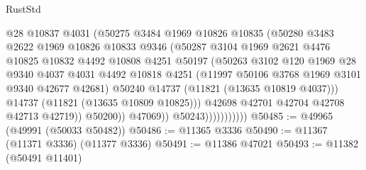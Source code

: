 \begin{lexlean}{RustStd}
\begin{coremodule}
                                  @28
                                  @10837
                                  @4031
                                  (@50275
                                    @3484
                                    @1969
                                    @10826
                                    @10835
                                    (@50280
                                      @3483
                                      @2622
                                      @1969
                                      @10826
                                      @10833
                                      @9346
                                      (@50287
                                        @3104
                                        @1969
                                        @2621
                                        @4476
                                        @10825
                                        @10832
                                        @4492
                                        @10808
                                        @4251
                                        @50197
                                        (@50263
                                          @3102
                                          @120
                                          @1969
                                          @28
                                          @9340
                                          @4037
                                          @4031
                                          @4492
                                          @10818
                                          @4251
                                          (@11997 @50106 @3768 @1969 @3101 @9340 @42677 @42681)
                                          @50240
                                          @14737
                                          (@11821 (@13635 @10819 @4037)))
                                        @14737
                                        (@11821 (@13635 @10809 @10825)))
                                      @42698
                                      @42701
                                      @42704
                                      @42708
                                      @42713
                                      @42719))
                                  @50200))
                              @47069))
                          @50243)))))))))))
@50485 := @49965 (@49991 (@50033 @50482))
@50486 := @11365 @3336
@50490 := @11367 (@11371 @3336) (@11377 @3336)
@50491 := @11386 @47021
@50493 := @11382 (@50491 @11401)

\end{coremodule}
\end{lexlean}
